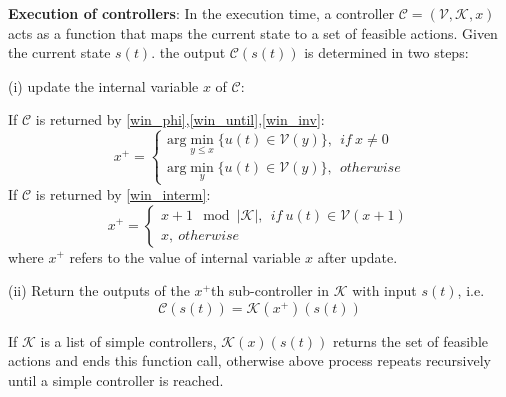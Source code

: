 \begin{definition} \textbf{Execution of controllers}:
	In the execution time, a controller $ \mathcal{C}=(\mathcal{V},\mathcal{K},x) $ acts as a function that maps the current state to a set of feasible actions. Given the current state $ s(t) $. the output $ \mathcal{C}(s(t)) $ is determined in two steps:
	
	(i) update the internal variable $ x $ of $ \mathcal{C} $: 

	\quad If $ \mathcal{C} $ is returned by \eqref{win_phi},\eqref{win_until},\eqref{win_inv}:
	\begin{displaymath}
	x^+ =	\begin{cases}
	\text{arg}\min_{y\leq x}\{u(t)\in \mathcal{V}(y)\},\ \ if\ x\not=0\\
	\text{arg}\min_{y}\{u(t)\in \mathcal{V}(y)\},\ \ otherwise
	\end{cases}
	\end{displaymath}
	\quad If $ \mathcal{C} $ is returned by \eqref{win_interm}:
	\begin{displaymath}
	x^+ = \begin{cases}
	x+1 \mod\vert\mathcal{K}\vert,\ \ if\ u(t)\in \mathcal{V}(x+1)\\
	x,\ otherwise
	\end{cases}
	\end{displaymath}
	where $ x^+ $ refers to the value of internal variable $ x $ after update.
	
	(ii) Return the outputs of the $ x^+ $th sub-controller in $ \mathcal{K} $ with input $ s(t) $, i.e.
	\begin{displaymath}
	\mathcal{C}(s(t)) = \mathcal{K}(x^+)(s(t))
	\end{displaymath}

	If $ \mathcal{K} $ is a list of simple controllers, $ \mathcal{K}(x)(s(t)) $ returns the set of feasible actions and ends this function call, otherwise above process repeats recursively until a simple controller is reached.
	

	\label{def:exec}
\end{definition}
